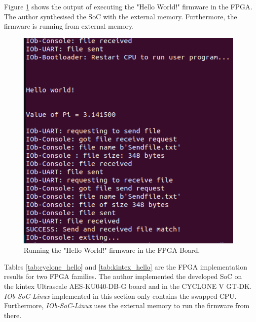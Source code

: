 Figure \ref{fig:hello_fpga} shows the output of executing the "Hello World!" firmware in the FPGA. The author synthesised the SoC with the external memory. Furthermore, the firmware is running from external memory.

\begin{figure}[!ht]
    \centering
    \includegraphics[width=\linewidth]{../images/end_hello_fpga.png}
    \caption{Running the "Hello World!" firmware in the FPGA Board.}
    \label{fig:hello_fpga}
\end{figure}

Tables \ref{tab:cyclone_hello} and \ref{tab:kintex_hello} are the FPGA implementation results for two FPGA families. The author implemented the developed SoC on the kintex Ultrascale AES-KU040-DB-G board and in the CYCLONE V GT-DK. \textit{IOb-SoC-Linux} implemented in this section only contains the swapped CPU. Furthermore, \textit{IOb-SoC-Linux} uses the external memory to run the firmware from there.

